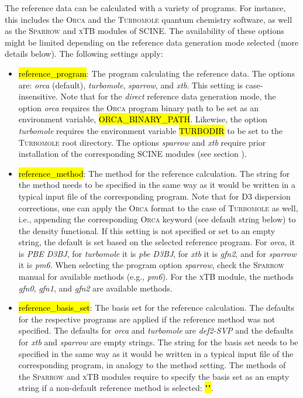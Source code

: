 \documentclass[]{tufte-book}
\begin{document}
The reference data can be calculated with a variety of programs. For instance, this includes the \textsc{Orca}\cite{orca} and the \textsc{Turbomole}\cite{ahlrichs89} quantum chemistry software, as well as the \textsc{Sparrow}\cite{sparrow_zenodo} and \textsc{xTB}\cite{bannwarth20} modules of SCINE. The availability of these options might be limited depending on the reference data generation mode selected (more details below). The following settings apply:

\begin{itemize}
\item \hl{reference\_program}: The program calculating the reference data. The options are: \textit{orca} (default), \textit{turbomole}, \textit{sparrow}, and \textit{xtb}. This setting is case-insensitive. Note that for the \textit{direct} reference data generation mode, the option \textit{orca} requires the \textsc{Orca} program binary path to be set as an environment variable, \hl{ORCA\_BINARY\_PATH}. Likewise, the option \textit{turbomole} requires the environment variable \hl{TURBODIR} to be set to the \textsc{Turbomole} root directory. The options \textit{sparrow} and \textit{xtb} require prior installation of the corresponding SCINE modules (see section ).
\item \hl{reference\_method}: The method for the reference calculation. The string for the method needs to be specified in the same way as it would be written in a typical input file of the
corresponding program. Note that for D3 dispersion corrections, one can apply the \textsc{Orca} format to the case of \textsc{Turbomole} as well, i.e., appending the corresponding \textsc{Orca} keyword (see default string below) to the density functional.
If this setting is not specified or set to an empty string, the default is set based on the selected reference program. For \textit{orca}, it is \textit{PBE D3BJ}, for \textit{turbomole} it is \textit{pbe D3BJ}, for \textit{xtb} it is \textit{gfn2}, and for \textit{sparrow} it is \textit{pm6}.
When selecting the program option \textit{sparrow}, check the \textsc{Sparrow} manual\cite{sparrow_zenodo} for available methods (e.g., \textit{pm6}). For the \textsc{xTB} module, the methods \textit{gfn0}, \textit{gfn1}, and \textit{gfn2} are available methods.
\item \hl{reference\_basis\_set}: The basis set for the reference calculation. The defaults for the respective programs are applied if the reference method was not specified. The defaults for \textit{orca} and \textit{turbomole} are \textit{def2-SVP} and the defaults for \textit{xtb} and \textit{sparrow} are empty strings. The string for the basis set needs to be specified in the same way as it would be written in a typical input file of the corresponding program, in analogy to the method setting. The methods of the \textsc{Sparrow} and \textsc{xTB} modules require to specify the basis set as an empty string if a non-default reference method is selected: \hl{"\:"}.

\end{itemize}
\end{document}
